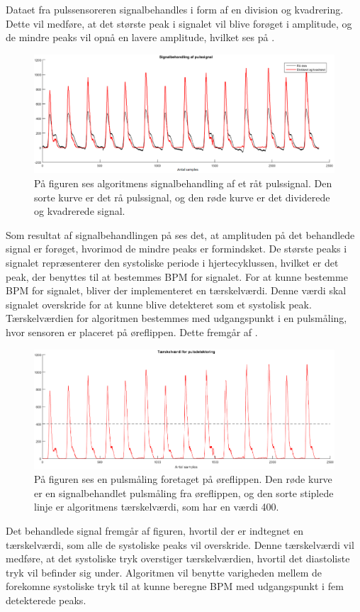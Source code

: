 Dataet fra pulssensoreren signalbehandles i form af en division og kvadrering. Dette vil medføre, at det største peak i signalet vil blive forøget i amplitude, og de mindre peaks vil opnå en lavere amplitude, hvilket ses på . 
\begin{figure}[H]
	\centering
	\includegraphics[scale=0.4]{figures/cDesign/puls_ore_behandlet.png}
	\caption{På figuren ses algoritmens signalbehandling af et råt pulssignal. Den sorte kurve er det rå pulssignal, og den røde kurve er det dividerede og kvadrerede signal.}
	\label{fig:behandlet_puls}
\end{figure}
Som resultat af signalbehandlingen på  ses det, at amplituden på det behandlede signal er forøget, hvorimod de mindre peaks er formindsket. De største peaks i signalet repræsenterer den systoliske periode i hjertecyklussen, hvilket er det peak, der benyttes til at bestemmes BPM for signalet. For at kunne bestemme BPM for signalet, bliver der implementeret en tærskelværdi. Denne værdi skal signalet overskride for at kunne blive detekteret som et systolisk peak. Tærskelværdien for algoritmen bestemmes med udgangspunkt i en pulsmåling, hvor sensoren er placeret på øreflippen. Dette fremgår af .
\begin{figure}[H]
	\centering
	\includegraphics[scale=0.4]{figures/cDesign/puls_taerskel.png}
	\caption{På figuren ses en pulsmåling foretaget på øreflippen. Den røde kurve er en signalbehandlet pulsmåling fra øreflippen, og den sorte stiplede linje er algoritmens tærskelværdi, som har en værdi 400.}
	\label{fig:taerskel_puls}
\end{figure} \vspace{-0.5cm}
Det behandlede signal fremgår af figuren, hvortil der er indtegnet en tærskelværdi, som alle de systoliske peaks vil overskride. Denne tærskelværdi vil medføre, at det systoliske tryk overstiger tærskelværdien, hvortil det diastoliste tryk vil befinder sig under. Algoritmen vil benytte varigheden mellem de forekomne systoliske tryk til at kunne beregne BPM med udgangspunkt i fem detekterede peaks. 

